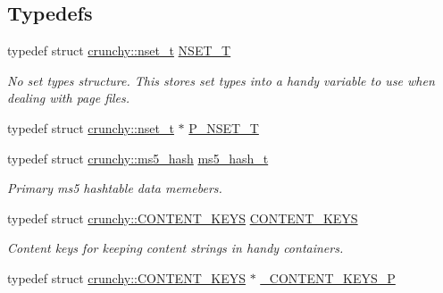 \subsection*{Typedefs}
\begin{DoxyCompactItemize}
\item 
typedef struct \hyperlink{structcrunchy_1_1nset__t}{crunchy\+::nset\+\_\+t} \hyperlink{namespacecrunchy_a675701955bf4d2f3c9f02332aec33cc0}{N\+S\+E\+T\+\_\+T}
\begin{DoxyCompactList}\small\item\em No set types structure. This stores set types into a handy variable to use when dealing with page files. \end{DoxyCompactList}\item 
typedef struct \hyperlink{structcrunchy_1_1nset__t}{crunchy\+::nset\+\_\+t} $\ast$ \hyperlink{namespacecrunchy_ab958409ccb75be47eba557824d83fb0e}{P\+\_\+\+N\+S\+E\+T\+\_\+T}
\item 
typedef struct \hyperlink{structcrunchy_1_1ms5__hash}{crunchy\+::ms5\+\_\+hash} \hyperlink{namespacecrunchy_a21315e3a9026f19da3135447e60f8955}{ms5\+\_\+hash\+\_\+t}
\begin{DoxyCompactList}\small\item\em Primary ms5 hashtable data memebers. \end{DoxyCompactList}\item 
typedef struct \hyperlink{structcrunchy_1_1_c_o_n_t_e_n_t___k_e_y_s}{crunchy\+::\+C\+O\+N\+T\+E\+N\+T\+\_\+\+K\+E\+YS} \hyperlink{namespacecrunchy_a6eff164c7bb3015fe59ea97d06ad97aa}{C\+O\+N\+T\+E\+N\+T\+\_\+\+K\+E\+YS}
\begin{DoxyCompactList}\small\item\em Content keys for keeping content strings in handy containers. \end{DoxyCompactList}\item 
typedef struct \hyperlink{structcrunchy_1_1_c_o_n_t_e_n_t___k_e_y_s}{crunchy\+::\+C\+O\+N\+T\+E\+N\+T\+\_\+\+K\+E\+YS} $\ast$ \hyperlink{namespacecrunchy_ae129fa6af952168d3ded4da75f1707c4}{\+\_\+\+C\+O\+N\+T\+E\+N\+T\+\_\+\+K\+E\+Y\+S\+\_\+P}
\end{DoxyCompactItemize}
